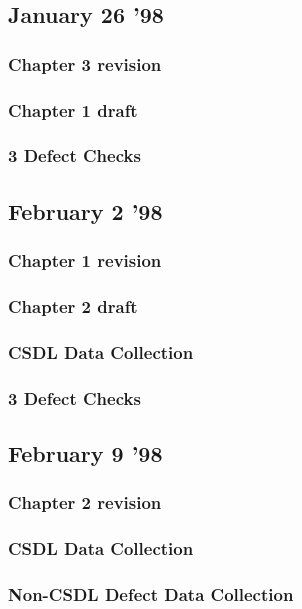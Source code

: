 \subsection{January 26 '98}
\subsubsection{Chapter 3 revision}
\subsubsection{Chapter 1 draft}
\subsubsection{3 Defect Checks}

\subsection{February 2 '98}
\subsubsection{Chapter 1 revision}
\subsubsection{Chapter 2 draft}
\subsubsection{CSDL Data Collection}
\subsubsection{3 Defect Checks}

\subsection{February 9 '98}
\subsubsection{Chapter 2 revision}
\subsubsection{CSDL Data Collection}
\subsubsection{Non-CSDL Defect Data Collection}
